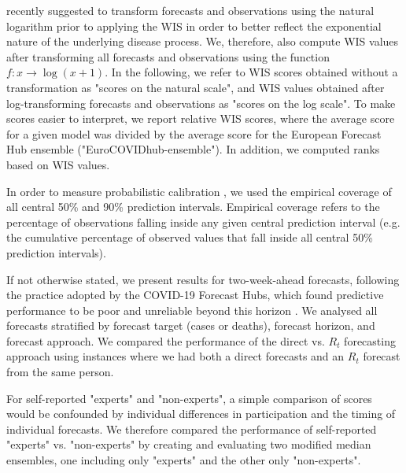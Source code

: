 \documentclass[10pt,a4paper,twocolumn]{article}
\begin{document}
\citet{bosseTransformationForecastsEvaluating2023} recently suggested to transform forecasts and observations using the natural logarithm prior to applying the WIS in order to better reflect the exponential nature of the underlying disease process. We, therefore, also compute WIS values after transforming all forecasts and observations using the function $f\colon x \to \log (x + 1)$. In the following, we refer to WIS scores obtained without a transformation as "scores on the natural scale", and WIS values obtained after log-transforming forecasts and observations as "scores on the log scale". To make scores easier to interpret, we report relative WIS scores, where the average score for a given model was divided by the average score for the European Forecast Hub ensemble ("EuroCOVIDhub-ensemble"). In addition, we computed ranks based on WIS values. 

In order to measure probabilistic calibration \citep{gneitingProbabilisticForecastsCalibration2007}, we used the empirical coverage of all central 50\% and 90\% prediction intervals. Empirical coverage refers to the percentage of observations falling inside any given central prediction interval (e.g. the cumulative percentage of observed values that fall inside all central 50\% prediction intervals). 

If not otherwise stated, we present results for two-week-ahead forecasts, following the practice adopted by the COVID-19 Forecast Hubs, which found predictive performance to be poor and unreliable beyond this horizon \cite{cramerEvaluationIndividualEnsemble2021, sherrattPredictivePerformanceMultimodel2022a, bracherShorttermForecastingCOVID192021}. We analysed all forecasts stratified by forecast target (cases or deaths), forecast horizon, and forecast approach. We compared the performance of the direct vs. $R_t$ forecasting approach using instances where we had both a direct forecasts and an $R_t$ forecast from the same person. 

For self-reported "experts" and "non-experts", a simple comparison of scores would be confounded by individual differences in participation and the timing of individual forecasts. We therefore compared the performance of self-reported "experts" vs. "non-experts" by creating and evaluating two modified median ensembles, one including only "experts" and the other only "non-experts".

\end{document}
